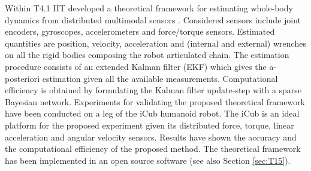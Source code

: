 

Within T4.1 IIT developed a theoretical framework for estimating whole-body
dynamics from distributed multimodal sensors \cite{Nori2015}. Considered sensors
include joint encoders, gyroscopes, accelerometers and force/torque sensors.
Estimated quantities are position, velocity, acceleration and (internal and
external) wrenches on all the rigid bodies composing the robot articulated
chain. The estimation procedure consists of an extended Kalman filter (EKF)
which gives the a-posteriori estimation given all the available measurements.
Computational efficiency is obtained by formulating the Kalman filter
update-step with a sparse Bayesian network. Experiments for validating the
proposed theoretical framework have been conducted on a leg of the iCub humanoid
robot. The iCub is an ideal platform for the proposed experiment given its
distributed force, torque, linear acceleration and angular velocity sensors.
Results have shown the accuracy and the computational efficiency of the proposed
method. The theoretical framework has been implemented in an open source
software (see also Section \ref{sec:T15}).